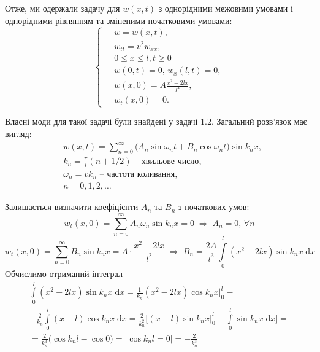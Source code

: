Отже, ми одержали задачу для $w(x,t)$ з однорідними межовими умовами і однорідними рівнянням та зміненими початковими умовами:
\begin{equation} 
    \left\{ \begin{aligned} 
            \;&w = w(x,t), \\
            &w_{tt} = v^2 w_{xx}, \\
            &0 \leq x \leq l, t \geq 0 \\
            &w(0,t) = 0, \, w_x(l,t) = 0, \\
            &w(x,0) = A \frac{x^2 - 2lx}{l^2},\\
            &w_t(x,0) = 0.
    \end{aligned} \right.
\end{equation}

 Власні моди для такої задачі були знайдені у задачі 1.2. Загальний розв'язок має вигляд:
\begin{equation}
    \begin{aligned}
        &w(x,t) = \sum_{n=0}^{\infty} \big(A_n\sin\omega_nt + B_n\cos\omega_nt \big) \sin k_nx,\\
        &k_n = \frac{\pi}{l}(n + 1/2) \text{ -- хвильове число},\\
        &\omega_n = v k_n \text{ -- частота коливання},\\
        &n = 0, 1, 2, \ldots        
    \end{aligned}
\end{equation}

Залишається визначити коефіцієнти $A_n$ та $B_n$ з початкових умов:
\begin{equation*}
    w_t(x,0) = \sum_{n=0}^{\infty} A_n\omega_n\sin k_nx = 0
    \;\Rightarrow\;
    A_n = 0,\, \forall n
\end{equation*}
\begin{equation*}
    w_t(x,0) = \sum_{n=0}^{\infty} B_n\sin k_nx = A \cdot \frac{x^2 - 2lx}{l^2} 
    \;\Rightarrow\;
    B_n = \frac{2A}{l^3} \int\limits_0^l (x^2 - 2lx) \sin k_nx \;\mathrm{d}x
\end{equation*}
Обчислимо отриманий інтеграл 
\begin{equation*}
    \begin{gathered}
        \int\limits_0^l (x^2 - 2lx) \sin k_nx \;\mathrm{d}x = \frac{1}{k_n} (x^2 - 2lx) \cos k_nx \bigg|_0^l -\\
        - \frac{2}{k_n} \int\limits_0^l (x-l) \cos k_nx \;\mathrm{d}x = \frac{2}{k_n^2} \bigg[(x-l)\sin k_nx \bigg|_0^l - \int\limits_0^l \sin k_nx \;\mathrm{d}x \bigg] =\\
        = \frac{2}{k_n^3} \big(\cos k_nl - \cos 0\big) = \bigg|\cos k_nl = 0\bigg| = -\frac{2}{k_n^3}
    \end{gathered}
\end{equation*}

